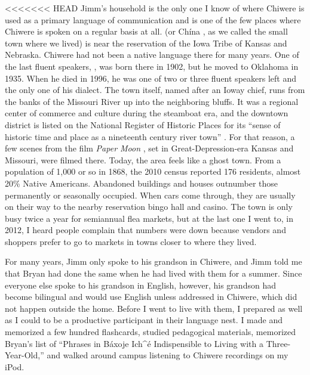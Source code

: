 \documentclass[output=paper]{LSP/langsci}
\begin{document}
<<<<<<< HEAD
Jimm's household is the only one I know of where Chiwere is used as a primary language of communication and is one of the few places where Chiwere is spoken on a regular basis at all.  (or Chína , as we called the small town where we lived) is near the reservation of the Iowa Tribe of Kansas and Nebraska. Chiwere had not been a native language there for many years. One of the last fluent speakers, , was born there in 1902, but he moved to Oklahoma in 1935. When he died in 1996, he was one of two or three fluent speakers left and the only one of his dialect. The town itself, named after an Ioway chief, runs from the banks of the Missouri River up into the neighboring bluffs. It was a regional center of commerce and culture during the steamboat era, and the downtown district is listed on the National Register of Historic Places for its ``sense of historic time and place as a nineteenth century river town'' \citep[1]{Wolfenbarger1996}. For that reason, a few scenes from the film \emph{Paper Moon} \citep{Bogdanovich1973}, set in Great-Depression-era Kansas and Missouri, were filmed there. Today, the area feels like a ghost town. From a population of 1,000 or so in 1868, the 2010 census reported 176 residents, almost 20\% Native Americans. Abandoned buildings and houses outnumber those permanently or seasonally occupied. When cars come through, they are usually on their way to the nearby reservation bingo hall and casino. The town is only busy twice a year for semiannual flea markets, but at the last one I went to, in 2012, I heard people complain that numbers were down because vendors and shoppers prefer to go to markets in towns closer to where they lived.

For many years, Jimm only spoke to his grandson in Chiwere, and Jimm told me that Bryan had done the same when he had lived with them for a summer. Since everyone else spoke to his grandson in English, however, his grandson had become bilingual and would use English unless addressed in Chiwere, which did not happen outside the home. Before I went to live with them, I prepared as well as I could to be a productive participant in their language nest. I made and memorized a few hundred flashcards, studied pedagogical materials, memorized Bryan's list of ``Phrases in Báxoje Ich\^{ }\'e Indispensible to Living with a Three-Year-Old,'' and walked around campus listening to Chiwere recordings on my iPod.
\end{document}

